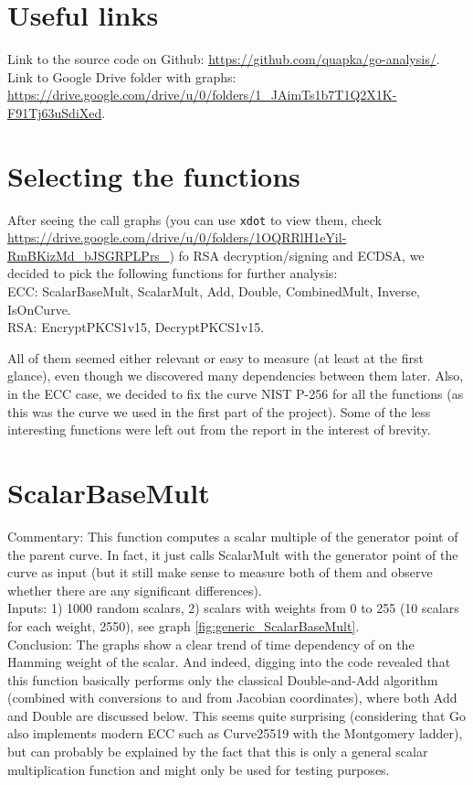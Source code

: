\documentclass[a4paper]{scrartcl}
\subtitle{}
\begin{document}

\section{Useful links}
Link to the source code on Github: \url{https://github.com/quapka/go-analysis/}.\\
Link to Google Drive folder with graphs: \url{https://drive.google.com/drive/u/0/folders/1_JAimTs1b7T1Q2X1K-F91Tj63uSdiXed}.

\section{Selecting the functions}
After seeing the call graphs (you can use \verb+xdot+ to view them, check \url{https://drive.google.com/drive/u/0/folders/1OQRRlH1eYil-RmBKizMd_bJSGRPLPrs_}) fo RSA decryption/signing and ECDSA, we decided to pick the following functions for further analysis:
\\ECC: ScalarBaseMult, ScalarMult, Add, Double, CombinedMult, Inverse, IsOnCurve.
\\RSA: EncryptPKCS1v15, DecryptPKCS1v15.

All of them seemed either relevant or easy to measure (at least at the first glance), even though we discovered many dependencies between them later. Also, in the ECC case, we decided to fix the curve NIST P-256 for all the functions (as this was the curve we used in the first part of the project). Some of the less interesting functions were left out from the report in the interest of brevity.

\section{ScalarBaseMult}
Commentary: This function computes a scalar multiple of the generator point of the parent curve. In fact, it just calls ScalarMult with the generator point of the curve as input (but it still make sense to measure both of them and observe whether there are any significant differences).
\\Inputs: 1) 1000 random scalars, 2) scalars with weights from 0 to 255 (10 scalars for each weight, 2550), see graph \ref{fig:generic_ScalarBaseMult}.
\\Conclusion: The graphs show a clear trend of time dependency of on the Hamming weight of the scalar. And indeed, digging into the code revealed that this function basically performs only the classical Double-and-Add algorithm (combined with conversions to and from Jacobian coordinates), where both Add and Double are discussed below. This seems quite surprising (considering that Go also implements modern ECC such as Curve25519 with the Montgomery ladder), but can probably be explained by the fact that this is only a general scalar multiplication function and might only be used for testing purposes.
\end{document}
